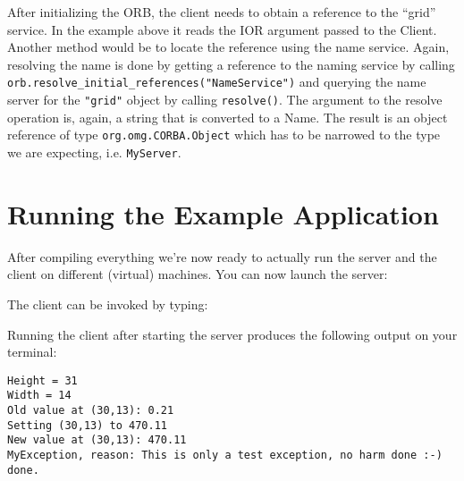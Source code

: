 After  initializing the  ORB, the  client needs to obtain  a reference
to the ``grid''  service. In the example above it reads the IOR argument
passed to the Client. Another method would be to locate the reference
using the  name service. Again, resolving the name is done by getting a reference to the naming service by calling {\tt orb.resolve\_initial\_references("NameService")} and querying the name server for the {\tt "grid"} object by calling {\tt resolve()}.  The argument to the resolve operation is, again, a string that is converted to a Name. The result is an object reference of type {\tt org.omg.CORBA.Object} which has to be narrowed to the type we are expecting, i.e. {\tt MyServer}.

\section{Running the Example Application}
\label{runningExampleApp}

After compiling everything we're now ready to actually run the server
and the client on different (virtual) machines. You can now launch the server:


The client can be invoked by typing:


Running the  client after starting  the server produces  the following
output on your terminal:

\begin{verbatim}
Height = 31
Width = 14
Old value at (30,13): 0.21
Setting (30,13) to 470.11
New value at (30,13): 470.11
MyException, reason: This is only a test exception, no harm done :-)
done.
\end{verbatim}

